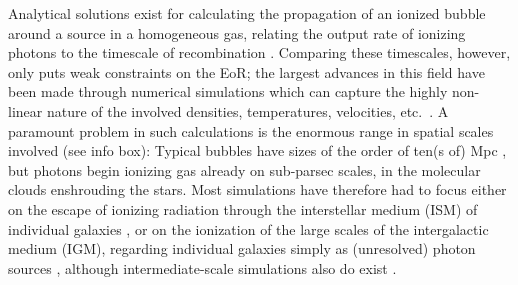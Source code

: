 \documentclass[useAMS,usenatbib,bibyear]{aa}
\begin{document}
Analytical solutions exist for calculating the propagation of an ionized bubble around a source in a homogeneous gas, relating the output rate of ionizing photons to the timescale of recombination \citep{Stromgren1939,Dopita2003}.
Comparing these timescales, however, only puts weak constraints on the EoR; the largest advances in this field have been made through numerical simulations which can capture the highly non-linear nature of the involved densities, temperatures, velocities, etc.~\citep[see e.g.][for recent advances regarding the topology of reionization]{Hutter2020,Perez2022}.
A paramount problem in such calculations is the enormous range in spatial scales involved (see info box):
Typical bubbles have sizes of the order of ten(s of) Mpc \citep{Wyithe2004,Giri2018}, but photons begin ionizing gas already on sub-parsec scales, in the molecular clouds enshrouding the stars.
Most simulations have therefore had to focus either on the escape of ionizing radiation through the interstellar medium (ISM) of individual galaxies \citep[e.g.][]{Haid2019}, or on the ionization of the large scales of the intergalactic medium (IGM), regarding individual galaxies simply as (unresolved) photon sources \citep[e.g.][]{Jensen2013,Jensen2014}, although intermediate-scale simulations also do exist \citep[e.g.][]{Rosdahl2022}.
\end{document}
